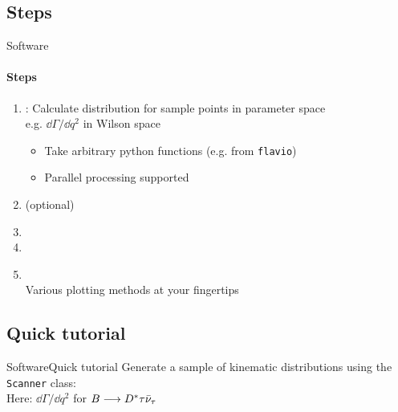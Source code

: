 \subsection{Steps}
\begin{frame}{Software}
    \framesubtitle{Steps}
    \begin{enumerate}
        \item<+-> : Calculate distribution for sample points in parameter space\\
        {\footnotesize e.g. $\dd\Gamma/\dd q^2$ in Wilson space}
        \begin{itemize}
            \item Take arbitrary python functions (e.g. from \texttt{flavio})
            \item Parallel processing supported
        \end{itemize}
        \item<+->  (optional)\\
        \item<+-> %
        \item<+-> %
        \item<+-> \\
        {\small Various plotting methods at your fingertips}
    \end{enumerate}
\end{frame}

\ifexamples
\subsection{Quick tutorial}
\begin{frame}[t, fragile]{Software}{Quick tutorial}
    Generate a sample of kinematic distributions using the \texttt{Scanner} class:\\
    {\footnotesize Here: $\dd\Gamma/\dd q^2$ for $B\longrightarrow D^*\tau\bar\nu_\tau$}
    

\end{frame}

